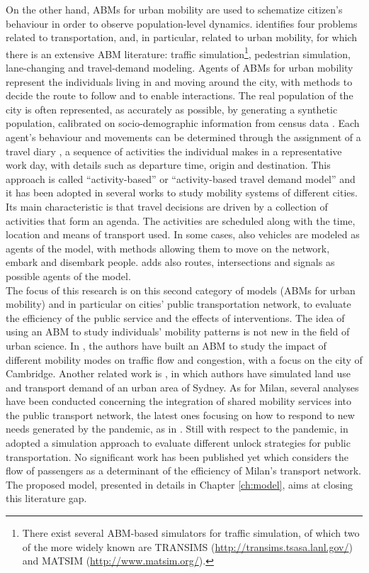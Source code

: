 On the other hand, ABMs for urban mobility are used to schematize citizen's behaviour in order to observe population-level dynamics.
\textcite{bernhardt2007agent} identifies four problems related to transportation, and, in particular, related to urban mobility, for which there is an extensive ABM literature: traffic simulation\footnote{There exist several ABM-based simulators for traffic simulation, of which two of the more widely known are TRANSIMS (\url{http://transims.tsasa.lanl.gov/}) and MATSIM (\url{http://www.matsim.org/}).}, pedestrian simulation, lane-changing and travel-demand modeling.  
Agents of ABMs for urban mobility represent the individuals living in and moving around the city, with methods to decide the route to follow and to enable interactions. The real population of the city is often represented, as accurately as possible, by generating a synthetic population, calibrated on socio-demographic information from census data \cite{bib6}. Each agent’s behaviour and movements can be determined through the assignment of a travel diary \cite{bib7}, a sequence of activities the individual makes in a representative work day, with details such as departure time, origin and destination. This approach is called “activity-based” \cite{bib8} or “activity-based travel demand model” \cite{bib3} and it has been adopted in several works to study mobility systems of different cities. Its main characteristic is that travel decisions are driven by a collection of activities that form an agenda. The activities are scheduled along with the time, location and means of transport used.
In some cases, also vehicles are modeled as agents of the model, with methods allowing them to move on the network, embark and disembark people. \textcite{Bazghandi_techniques} adds also routes, intersections and signals as possible agents of the model. \\

The focus of this research is on this second category of models (ABMs for urban mobility) and in particular on cities' public transportation network, to evaluate the efficiency of the public service and the effects of interventions. The idea of using an ABM to study individuals’ mobility patterns is not new in the field of urban science. In \textcite{bib9}, the authors have built an ABM to study the impact of different mobility modes on traffic flow and congestion, with a focus on the city of Cambridge. Another related work is \textcite{bib7}, in which authors have simulated land use and transport demand of an urban area of Sydney. As for Milan, several analyses have been conducted concerning the integration of shared mobility services into the public transport network, the latest ones focusing on how to respond to new needs generated by the pandemic, as in \textcite{bib10}. Still with respect to the pandemic, in \textcite{bib11} adopted a simulation approach to evaluate different unlock strategies for public transportation. No significant work has been published yet which considers the flow of passengers as a determinant of the efficiency of Milan’s transport network. The proposed model, presented in details in Chapter \ref{ch:model}, aims at closing this literature gap. 


